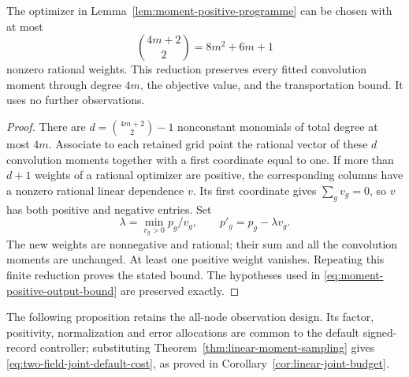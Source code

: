 \begin{corollary}
\label{cor:moment-positive-compression}
The optimizer in Lemma~\ref{lem:moment-positive-programme} can be
chosen with at most
\begin{equation}\label{eq:moment-sparse-output-size}
             \binom{4m+2}{2}=8m^2+6m+1
\end{equation}
nonzero rational weights.  This reduction preserves every fitted
convolution moment through degree $4m$, the objective value, and
the transportation bound.  It uses no further observations.
\end{corollary}
\begin{proof}
There are $d=\binom{4m+2}{2}-1$ nonconstant monomials of total
degree at most $4m$.  Associate to each retained grid point the
rational vector of these $d$ convolution moments together with a
first coordinate equal to one.  If more than $d+1$ weights of a
rational optimizer are positive, the corresponding columns have
a nonzero rational linear dependence $v$.  Its first coordinate
gives $\sum_gv_g=0$, so $v$ has both positive and negative
entries.  Set
\[
       \lambda=\min_{v_g>0}p_g/v_g,
                  \qquad p'_g=p_g-\lambda v_g.
\]
The new weights are nonnegative and rational; their sum and all
the convolution moments are unchanged.  At least one positive
weight vanishes.  Repeating this finite reduction proves the
stated bound.  The hypotheses used in
\eqref{eq:moment-positive-output-bound} are preserved exactly.
\end{proof}

The following proposition retains the all-node observation design.
Its factor, positivity, normalization and error allocations are common
to the default signed-record controller; substituting
Theorem~\ref{thm:linear-moment-sampling} gives
\eqref{eq:two-field-joint-default-cost}, as proved in
Corollary~\ref{cor:linear-joint-budget}.

